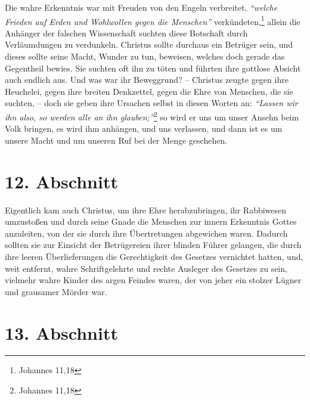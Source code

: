 Die wahre Erkenntnis war mit Freuden von den
Engeln verbreitet, \textit{"`welche Frieden auf Erden
und Wohlwollen gegen die Menschen"'}
verkündeten,\footnote{Johannes 11,18}
allein die Anhänger der falschen Wissenschaft
suchten diese Botschaft durch Verläumdungen zu verdunkeln. Christus sollte
durchaus ein Betrüger sein, und dieses sollte seine Macht, Wunder
zu tun,
beweisen, welches doch gerade das Gegentheil bewies. Sie suchten oft ihn zu
töten und führten ihre gottlose Absicht auch endlich aus. Und was war ihr
Beweggrund? -- Christus zeugte gegen ihre Heuchelei, gegen ihre
breiten
Denkzettel, gegen die Ehre von Menschen, die sie suchten, -- doch sie geben ihre
Ursachen selbst in diesen Worten an:
\textit{"`Lassen wir ihn also, so werden alle an ihn
glauben;"'}\footnote{Johannes 11,18}
so wird er uns um unser Ansehn beim Volk
bringen, es wird ihm anhängen, und uns verlassen, und dann ist es um unsere
Macht und um unseren Ruf bei der Menge geschehen.

\section{12. Abschnitt} \label{kap7_ab12}

Eigentlich kam auch Christus, um ihre Ehre herabzubringen, ihr Rabbiwesen
umzustoßen und durch seine Gnade die Menschen zur innern Erkenntnis Gottes
anzuleiten, von der sie durch ihre Übertretungen abgewichen waren. Dadurch
sollten sie zur Einsicht der Betrügereien ihrer blinden
Führer gelangen, die
durch ihre leeren Überlieferungen die Gerechtigkeit des
Gesetzes vernichtet
hatten, und, weit entfernt, wahre Schriftgelehrte und rechte Ausleger des
Gesetzes zu sein, vielmehr wahre Kinder des argen Feindes waren, der von jeher
ein stolzer Lügner und grausamer Mörder war.

\section{13. Abschnitt} \label{kap7_ab13}

